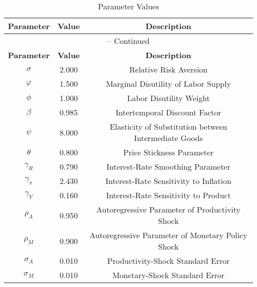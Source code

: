 \begin{center}
\begin{longtable}{ccc}
\caption{Parameter Values}\\%
\toprule%
\multicolumn{1}{c}{\textbf{Parameter}} &
\multicolumn{1}{c}{\textbf{Value}} &
 \multicolumn{1}{c}{\textbf{Description}}\\%
\midrule%
\endfirsthead
\multicolumn{3}{c}{{\tablename} \thetable{} -- Continued}\\%
\midrule%
\multicolumn{1}{c}{\textbf{Parameter}} &
\multicolumn{1}{c}{\textbf{Value}} &
  \multicolumn{1}{c}{\textbf{Description}}\\%
\midrule%
\endhead
${\sigma}$ 	 & 	 2.000 	 & 	 Relative Risk Aversion\\
${\varphi}$ 	 & 	 1.500 	 & 	 Marginal Disutility of Labor Supply\\
${\phi}$ 	 & 	 1.000 	 & 	 Labor Disutility Weight\\
${\beta}$ 	 & 	 0.985 	 & 	 Intertemporal Discount Factor\\
${\psi}$ 	 & 	 8.000 	 & 	 Elasticity of Substitution between Intermediate Goods\\
${\theta}$ 	 & 	 0.800 	 & 	 Price Stickness Parameter\\
${\gamma_R}$ 	 & 	 0.790 	 & 	 Interest-Rate Smoothing Parameter\\
${\gamma_\pi}$ 	 & 	 2.430 	 & 	 Interest-Rate Sensitivity to Inflation\\
${\gamma_Y}$ 	 & 	 0.160 	 & 	 Interest-Rate Sensitivity to Product\\
${\rho_A}$ 	 & 	 0.950 	 & 	 Autoregressive Parameter of Productivity Shock\\
${\rho_M}$ 	 & 	 0.900 	 & 	 Autoregressive Parameter of Monetary Policy Shock\\
${\sigma_A}$ 	 & 	 0.010 	 & 	 Productivity-Shock Standard Error\\
${\sigma_M}$ 	 & 	 0.010 	 & 	 Monetary-Shock Standard Error\\
\bottomrule%
\end{longtable}
\end{center}
